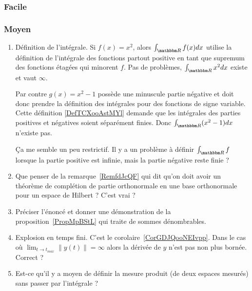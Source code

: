 \subsubsection{Facile}


\subsubsection{Moyen}       \label{SUBSEUBSECooCCKFooOXsnwG}

\begin{enumerate}
    \item
        Définition de l'intégrale. Si \( f(x)=x^2\), alors \( \int_{\eR}f(x)dx\) utilise la définition de l'intégrale des fonctions partout positive en tant que supremum des fonctions étagées qui minorent \( f\). Pas de problèmes, \( \int_{\eR}x^2dx\) existe et vaut \( \infty\).

        Par contre \( g(x)=x^2-1\) possède une minuscule partie négative et doit donc prendre la définition des intégrales pour des fonctions de signe variable. Cette définition \ref{DefTCXooAstMYl} demande que les intégrales des parties positives et négatives soient séparément finies. Donc \( \int_{\eR} (x^2-1)dx\) n'existe pas.

        Ça me semble un peu restrictif. Il y a un problème à définir \( \int_{\eR}f\) lorsque la partie positive est infinie, mais la partie négative reste finie ?
    \item
        Que penser de la remarque~\ref{RemfdJcQF} qui dit qu'on doit avoir un théorème de complétion de partie orthonormale en une base orthonormale pour un espace de Hilbert ? C'est vrai ?
    \item
        Préciser l'énoncé et donner une démonstration de la proposition~\ref{PropMpBStL} qui traite de sommes dénombrables.
    \item
        Explosion en temps fini. C'est le corolaire~\ref{CorGDJQooNEIvpp}. Dans le cas où \( \lim_{t\to t_{max}} \| y(t) \|=\infty\) alors la dérivée de \( y\) n'est pas non plus bornée. Correct ?
    \item
        Est-ce qu'il y a moyen de définir la mesure produit (de deux espaces mesurés) sans passer par l'intégrale ? 


\end{enumerate}
